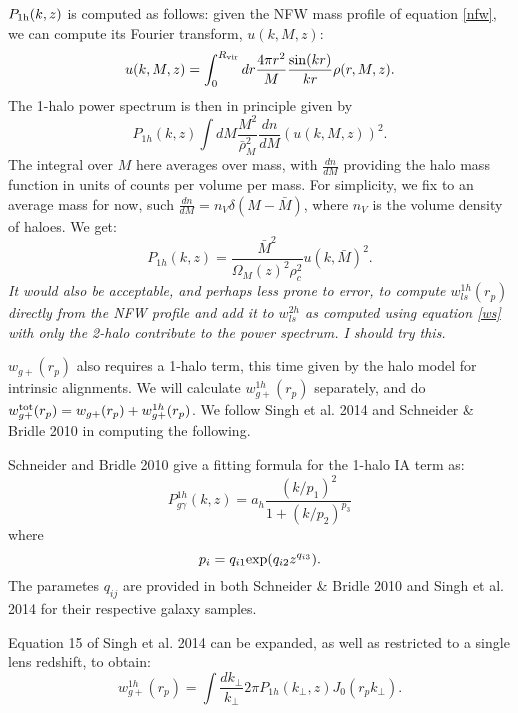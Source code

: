 \documentclass[onecolumn,amsmath,aps,fleqn, superscriptaddress]{revtex4}
\begin{document}
$P_{\rm 1h}(k,z)$ is computed as follows: given the NFW mass profile of equation \ref{nfw}, we can compute its Fourier transform, $u(k, M, z)$:
\begin{equation}
u(k, M, z) = \int_0^{R_{\rm vir}} dr \frac{4 \pi r^2}{M}\frac{\sin(kr)}{kr}\rho(r, M, z).
\label{u}
\end{equation}
The 1-halo power spectrum is then in principle given by
\begin{equation}
P_{1h}(k,z) \int dM \frac{M^2}{\bar{\rho}_M^2} \frac{dn}{dM} (u(k, M, z))^2.
\label{P1h_dndm}
\end{equation}
The integral over $M$ here averages over mass, with $\frac{dn}{dM}$ providing the halo mass function in units of counts per volume per mass. For simplicity, we fix to an average mass for now, such $\frac{dn}{dM} = n_V \delta(M-\bar{M})$, where $n_V$ is the volume density of haloes. We get: 
\begin{equation}
P_{1h}(k,z) =\frac{\bar{M}^2}{\Omega_M(z)^2 \rho_c^2} u(k,\bar{M})^2.
\label{P1h_onemass}
\end{equation}
{\it It would also be acceptable, and perhaps less prone to error, to compute $w_{ls}^{1h}(r_p)$ directly from the NFW profile and add it to $w_{ls}^{2h}$ as computed using equation \ref{ws} with only the 2-halo contribute to the power spectrum. I should try this.}

$w_{g+}(r_p)$ also requires a 1-halo term, this time given by the halo model for intrinsic alignments. We will calculate $w_{g+}^{1h}(r_p)$ separately, and do $w_{g+}^{\rm tot}(r_p) = w_{g+}(r_p) + w_{g+}^{1h}(r_p)$. We follow Singh et al. 2014 and Schneider \& Bridle 2010 in computing the following.

Schneider and Bridle 2010 give a fitting formula for the 1-halo IA term as:
\begin{equation}
P^{1h}_{g\gamma}(k,z) = a_h \frac{(k/p_1)^2}{1+ (k/p_2)^{p_3}}
\label{P1hIA}
\end{equation}
where
\begin{equation}
p_i = q_{i1} {\rm exp}(q_{i2} z^{q_{i3}}).
\label{pi}
\end{equation}
The parametes $q_{ij}$ are provided in both Schneider \& Bridle 2010 and Singh et al. 2014 for their respective galaxy samples.

Equation 15 of Singh et al. 2014 can be expanded, as well as restricted to a single lens redshift, to obtain:
\begin{equation}
w_{g+}^{1h}(r_p) = \int \frac{dk_\perp}{k_\perp}{2\pi} P_{1h}(k_\perp,z) J_0(r_p k_\perp).
\label{wg1h}
\end{equation}
\end{document}

